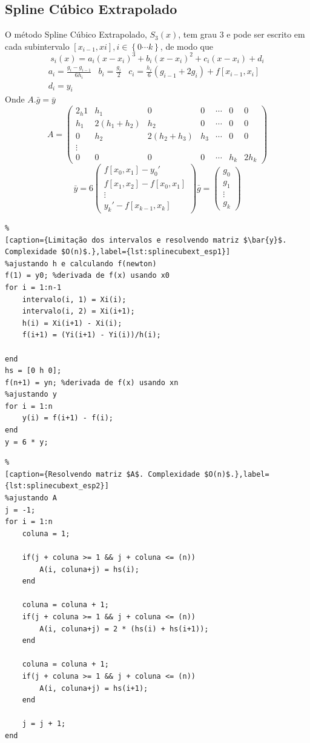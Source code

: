 \documentclass[conference]{IEEEtran}
\begin{document}
\subsection{Spline Cúbico Extrapolado} \label{subsec:splinecubext}
O método Spline Cúbico Extrapolado, $S_{3}(x)$, tem grau $3$ e pode ser escrito em cada subintervalo $[x_{i-1}, x{i}], i \in \left \{ 0 \cdots k  \right \} $, de modo que
$$
s_{i}(x)=a_{i}(x-x_{i})^{3}+b_{i}(x-x_{i})^{2}+c_{i}(x-x_{i}) + d_{i}
$$
$$
\begin{matrix}
a_i = \frac{g_i - g_{i-1}}{6h_i} & b_i = \frac{g_i}{2} & c_i = \frac{h_i}{6}(g_{i-1}+2g_i)+f[x_{i-1}, x_i] & \\ d_i=y_i
\end{matrix}
$$
Onde
$A.\bar{g}=\bar{y}$
$$
A=\begin{pmatrix}
2_h1 &h_1  & 0 & 0 & \cdots & 0 & 0\\ 
 h_1& 2(h_1+h_2) &h_2  & 0 & \cdots & 0 & 0 \\ 
 0 &  h_2& 2(h_2+h_3) &h_3  & \cdots &0 & 0 \\ 
 \vdots  \\ 
 0& 0 & 0 & 0 & \cdots & h_k&2h_k 
\end{pmatrix}
$$
$$
\bar{y} = 6\begin{pmatrix}
 f[x_0,x_1] - {y_0}'
\\ f[x_1,x_2] - f[x_0,x_1]
\\ \vdots 
\\{y_k}' - f[x_{k-1},x_k]
\end{pmatrix} 
\bar{g} = \begin{pmatrix}
 g_0
\\ g_1
\\ \vdots 
\\g_k
\end{pmatrix}
$$

\begin{lstlisting}%
[caption={Limitação dos intervalos e resolvendo matriz $\bar{y}$. Complexidade $O(n)$.},label={lst:splinecubext_esp1}]
%ajustando h e calculando f(newton)
f(1) = y0; %derivada de f(x) usando x0
for i = 1:n-1
    intervalo(i, 1) = Xi(i);
    intervalo(i, 2) = Xi(i+1);
    h(i) = Xi(i+1) - Xi(i);
    f(i+1) = (Yi(i+1) - Yi(i))/h(i);

end
hs = [0 h 0];
f(n+1) = yn; %derivada de f(x) usando xn
%ajustando y
for i = 1:n
    y(i) = f(i+1) - f(i);
end
y = 6 * y;
\end{lstlisting}

\begin{lstlisting}%
[caption={Resolvendo matriz $A$. Complexidade $O(n)$.},label={lst:splinecubext_esp2}]
%ajustando A
j = -1;
for i = 1:n
    coluna = 1;

    if(j + coluna >= 1 && j + coluna <= (n))
        A(i, coluna+j) = hs(i);
    end
    
    coluna = coluna + 1;
    if(j + coluna >= 1 && j + coluna <= (n))
        A(i, coluna+j) = 2 * (hs(i) + hs(i+1));
    end
    
    coluna = coluna + 1;
    if(j + coluna >= 1 && j + coluna <= (n))
        A(i, coluna+j) = hs(i+1);
    end
    
    j = j + 1;
end
\end{lstlisting}
\end{document}
